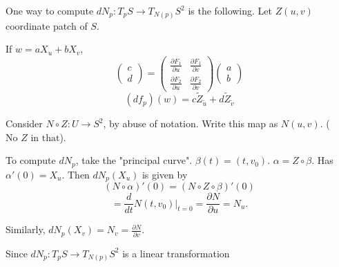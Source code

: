 \documentclass{article}
\begin{document}
\begin{remark}
    One way to compute $d N_p: T_p S \to T_{N(p)} S^2$ is the following. Let $Z(u, v)$ coordinate patch of $S$.

    \begin{center}
    \end{center}

    If $w = a X_u + b X_v$,
    $$\begin{pmatrix} c \\ d \end{pmatrix} = \begin{pmatrix} \frac{\partial F_1}{\partial u} & \frac{\partial F_1}{\partial v} \\ \frac{\partial F_2}{\partial u} & \frac{\partial F_2}{\partial v} \end{pmatrix} \begin{pmatrix} a \\ b \end{pmatrix}$$
    $$(d f_p)(w) = c \tilde{Z}_{\tilde{u}} + d \tilde{Z}_{\tilde{v}}$$

    Consider $N \circ Z: U \to S^2$, by abuse of notation.
    Write this map as $N(u, v)$. ($\text{No } Z \text{ in that}$).

    To compute $d N_p$, take the "principal curve".
    $\beta(t) = (t, v_0)$. $\alpha = Z \circ \beta$. Has $\alpha'(0)=X_u$.
    Then $d N_p (X_u)$ is given by
    $$(N \circ \alpha)'(0) = (N \circ Z \circ \beta)'(0)$$
    $$= \frac{d}{d t} N(t, v_0)|_{t=0} = \frac{\partial N}{\partial u} = N_u.$$

    Similarly, $d N_p (X_v) = N_v = \frac{\partial N}{\partial v}$.

    Since $d N_p: T_p S \to T_{N(p)} S^2$ is a linear transformation
\end{remark}
\end{document}
